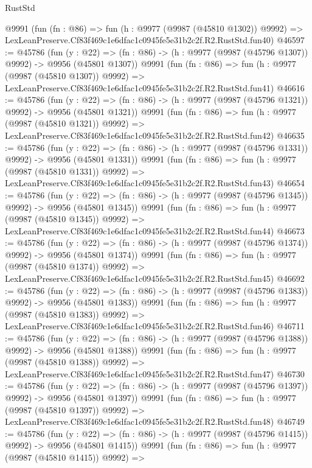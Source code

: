 \begin{lexlean}{RustStd}
\begin{coremodule}
    @9991
    (fun (fn : @86) =>
    fun (h : @9977 (@9987 (@45810 @1302)) @9992) =>
    LexLeanPreserve.Cf83f469c1e6dfac1c0945fe5e31b2c2f.R2.RustStd.fun40)
@46597 := @45786
    (fun (y : @22) =>
    (fn : @86) -> (h : @9977 (@9987 (@45796 @1307)) @9992) -> @9956 (@45801 @1307))
    @9991
    (fun (fn : @86) =>
    fun (h : @9977 (@9987 (@45810 @1307)) @9992) =>
    LexLeanPreserve.Cf83f469c1e6dfac1c0945fe5e31b2c2f.R2.RustStd.fun41)
@46616 := @45786
    (fun (y : @22) =>
    (fn : @86) -> (h : @9977 (@9987 (@45796 @1321)) @9992) -> @9956 (@45801 @1321))
    @9991
    (fun (fn : @86) =>
    fun (h : @9977 (@9987 (@45810 @1321)) @9992) =>
    LexLeanPreserve.Cf83f469c1e6dfac1c0945fe5e31b2c2f.R2.RustStd.fun42)
@46635 := @45786
    (fun (y : @22) =>
    (fn : @86) -> (h : @9977 (@9987 (@45796 @1331)) @9992) -> @9956 (@45801 @1331))
    @9991
    (fun (fn : @86) =>
    fun (h : @9977 (@9987 (@45810 @1331)) @9992) =>
    LexLeanPreserve.Cf83f469c1e6dfac1c0945fe5e31b2c2f.R2.RustStd.fun43)
@46654 := @45786
    (fun (y : @22) =>
    (fn : @86) -> (h : @9977 (@9987 (@45796 @1345)) @9992) -> @9956 (@45801 @1345))
    @9991
    (fun (fn : @86) =>
    fun (h : @9977 (@9987 (@45810 @1345)) @9992) =>
    LexLeanPreserve.Cf83f469c1e6dfac1c0945fe5e31b2c2f.R2.RustStd.fun44)
@46673 := @45786
    (fun (y : @22) =>
    (fn : @86) -> (h : @9977 (@9987 (@45796 @1374)) @9992) -> @9956 (@45801 @1374))
    @9991
    (fun (fn : @86) =>
    fun (h : @9977 (@9987 (@45810 @1374)) @9992) =>
    LexLeanPreserve.Cf83f469c1e6dfac1c0945fe5e31b2c2f.R2.RustStd.fun45)
@46692 := @45786
    (fun (y : @22) =>
    (fn : @86) -> (h : @9977 (@9987 (@45796 @1383)) @9992) -> @9956 (@45801 @1383))
    @9991
    (fun (fn : @86) =>
    fun (h : @9977 (@9987 (@45810 @1383)) @9992) =>
    LexLeanPreserve.Cf83f469c1e6dfac1c0945fe5e31b2c2f.R2.RustStd.fun46)
@46711 := @45786
    (fun (y : @22) =>
    (fn : @86) -> (h : @9977 (@9987 (@45796 @1388)) @9992) -> @9956 (@45801 @1388))
    @9991
    (fun (fn : @86) =>
    fun (h : @9977 (@9987 (@45810 @1388)) @9992) =>
    LexLeanPreserve.Cf83f469c1e6dfac1c0945fe5e31b2c2f.R2.RustStd.fun47)
@46730 := @45786
    (fun (y : @22) =>
    (fn : @86) -> (h : @9977 (@9987 (@45796 @1397)) @9992) -> @9956 (@45801 @1397))
    @9991
    (fun (fn : @86) =>
    fun (h : @9977 (@9987 (@45810 @1397)) @9992) =>
    LexLeanPreserve.Cf83f469c1e6dfac1c0945fe5e31b2c2f.R2.RustStd.fun48)
@46749 := @45786
    (fun (y : @22) =>
    (fn : @86) -> (h : @9977 (@9987 (@45796 @1415)) @9992) -> @9956 (@45801 @1415))
    @9991
    (fun (fn : @86) =>
    fun (h : @9977 (@9987 (@45810 @1415)) @9992) =>

\end{coremodule}
\end{lexlean}
